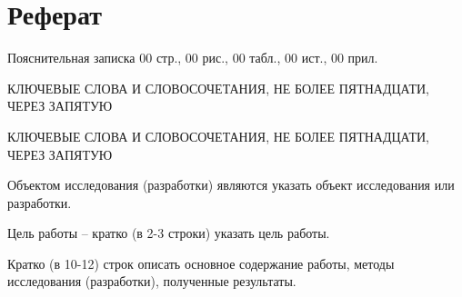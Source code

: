 \chapter*{Реферат}
\setcounter{page}{4}

\lipsum[1]

Пояснительная записка 00 стр., 00 рис., 00 табл., 00 ист., 00 прил.

КЛЮЧЕВЫЕ СЛОВА И СЛОВОСОЧЕТАНИЯ, НЕ БОЛЕЕ ПЯТНАДЦАТИ, ЧЕРЕЗ ЗАПЯТУЮ

\uppercase{Ключевые слова и словосочетания, не более пятнадцати, через запятую}

Объектом исследования (разработки) являются указать объект исследования или разработки.

Цель работы – кратко (в 2-3 строки) указать цель работы.

Кратко (в 10-12) строк описать основное содержание работы, методы исследования (разработки), полученные результаты.
